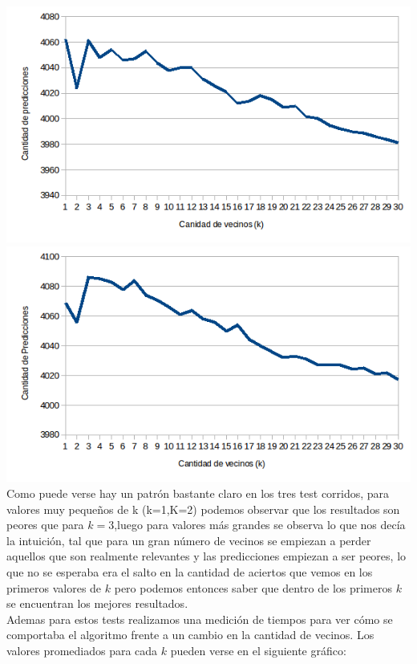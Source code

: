 \includegraphics[scale=0.55]{nuevosResultados/knn/2.png}\\

\includegraphics[scale=0.55]{nuevosResultados/knn/3.png}\\

Como puede verse hay un patrón bastante claro en los tres test corridos, para valores muy pequeños de k (k=1,K=2) podemos observar que los resultados son peores que para $k=3$,luego para valores más grandes se observa lo que nos decía la intuición, tal que para un gran número de vecinos se empiezan a perder aquellos que son realmente relevantes y las predicciones empiezan a ser peores, lo que no se esperaba era el salto en la cantidad de aciertos que vemos en los primeros valores de $k$ pero podemos entonces saber que dentro de los primeros $k$ se encuentran los mejores resultados.  
\\
Ademas para estos tests realizamos una medición de tiempos para ver cómo se comportaba el algoritmo frente a un cambio en la cantidad de vecinos. Los valores promediados para cada $k$ pueden verse en el siguiente gráfico:

